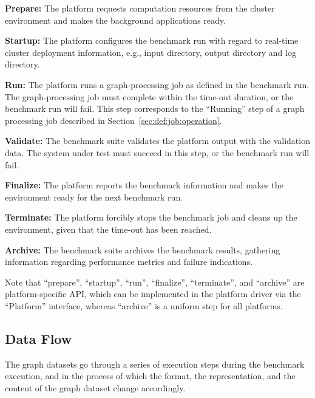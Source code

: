 \begin{enumerate}[label=\textbf{[\arabic*]}]
    \item \textbf{Prepare:} The platform requests computation resources from the cluster environment and makes the background applications ready.
    
    \item \textbf{Startup:} The platform configures the benchmark run with regard to real-time cluster deployment information, e.g., input directory, output directory and log directory.
    
    \item \textbf{Run:} The platform runs a graph-processing job as defined in the benchmark run. The graph-processing job must complete within the time-out duration, or the benchmark run will fail. This step corresponds to the ``Running'' step of a graph processing job described in Section~\ref{sec:def:job:operation}.
    
    \item \textbf{Validate:} The benchmark suite validates the platform output with the validation data. The system under test must succeed in this step, or the benchmark run will fail.
    
    \item \textbf{Finalize:} The platform reports the benchmark information and makes the environment ready for the next benchmark run.
    
    \item \textbf{Terminate:} The platform forcibly stops the benchmark job and cleans up the environment, given that the time-out has been reached. 
    
    \item \textbf{Archive:} The benchmark suite archives the benchmark results, gathering information regarding performance metrics and failure indications.
\end{enumerate}

Note that ``prepare'', ``startup'', ``run'', ``finalize'', ``terminate'', and ``archive'' are platform-specific API, which can be implemented in the platform driver via the ``Platform'' interface, whereas ``archive'' is a uniform step for all platforms.  


\subsection{Data Flow}
\label{sec:process:execution:data_flow}
The graph datasets go through a series of execution steps during the benchmark execution, and in the process of which the format, the representation, and the content of the graph dataset change accordingly.

